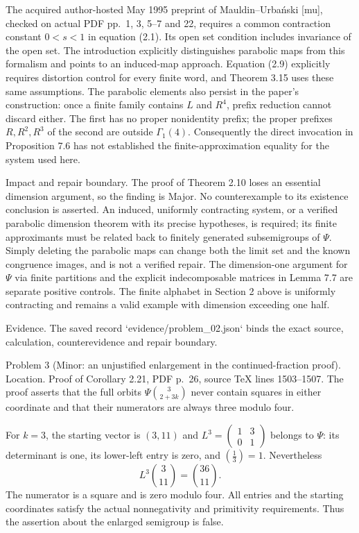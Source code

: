 \documentclass[10pt]{article}
\begin{document}
The acquired author-hosted May 1995 preprint of Mauldin–Urbański [mu], checked on actual PDF pp. 1, 3, 5–7 and 22, requires a common contraction constant \(0<s<1\) in equation (2.1). Its open set condition includes invariance of the open set. The introduction explicitly distinguishes parabolic maps from this formalism and points to an induced-map approach. Equation (2.9) explicitly requires distortion control for every finite word, and Theorem 3.15 uses these same assumptions. The parabolic elements also persist in the paper’s construction: once a finite family contains \(L\) and \(R^4\), prefix reduction cannot discard either. The first has no proper nonidentity prefix; the proper prefixes \(R,R^2,R^3\) of the second are outside \(\Gamma_1(4)\). Consequently the direct invocation in Proposition 7.6 has not established the finite-approximation equality for the system used here.\par
Impact and repair boundary. The proof of Theorem 2.10 loses an essential dimension argument, so the finding is Major. No counterexample to its existence conclusion is asserted. An induced, uniformly contracting system, or a verified parabolic dimension theorem with its precise hypotheses, is required; its finite approximants must be related back to finitely generated subsemigroups of \(\Psi\). Simply deleting the parabolic maps can change both the limit set and the known congruence images, and is not a verified repair. The dimension-one argument for \(\Psi\) via finite partitions and the explicit indecomposable matrices in Lemma 7.7 are separate positive controls. The finite alphabet in Section 2 above is uniformly contracting and remains a valid example with dimension exceeding one half.\par
Evidence. The saved record `evidence/problem\_02.json` binds the exact source, calculation, counterevidence and repair boundary.\par
Problem 3 (Minor: an unjustified enlargement in the continued-fraction proof).  Location. Proof of Corollary 2.21, PDF p. 26, source TeX lines 1503–1507. The proof asserts that the full orbits \(\Psi\binom{3}{2+3k}\) never contain squares in either coordinate and that their numerators are always three modulo four.\par
For \(k=3\), the starting vector is \((3,11)\) and \(L^3=\begin{pmatrix}1&3\\0&1\end{pmatrix}\) belongs to \(\Psi\): its determinant is one, its lower-left entry is zero, and \(\left(\frac{1}{3}\right)=1\). Nevertheless \[L^3\binom{3}{11}=\binom{36}{11}.
 \tag{3.3}\] The numerator is a square and is zero modulo four. All entries and the starting coordinates satisfy the actual nonnegativity and primitivity requirements. Thus the assertion about the enlarged semigroup is false.\par
\end{document}

